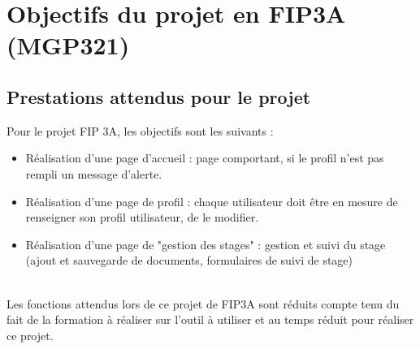 \section{Objectifs du projet en FIP3A (MGP321)}

\subsection{Prestations attendus pour le projet }

Pour le projet FIP 3A, les objectifs sont les suivants :

\begin{itemize}
    \item Réalisation d'une page d'accueil : page comportant, si le profil n'est pas rempli un message d'alerte.
    \item Réalisation d'une page de profil : chaque utilisateur doit être en mesure de renseigner son profil utilisateur, de le modifier. 
    \item Réalisation d'une page de "gestion des stages" : gestion et suivi du stage (ajout et sauvegarde de documents, formulaires de suivi de stage) \\
\end{itemize}

\\Les fonctions attendus lors de ce projet de FIP3A sont réduits compte tenu du fait de la formation à réaliser sur l'outil à utiliser et au temps réduit pour réaliser ce projet.